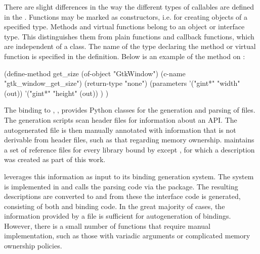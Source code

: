 \documentclass[article,shortnames]{jss}
\begin{document}
There are slight differences in the way the different types of
callables are defined in the . Functions may be marked
as constructors, i.e. for creating objects of a specified type.
Methods and virtual functions belong to an object or interface type.
This distinguishes them from plain functions and callback functions,
which are independent of a class. The name of the type declaring the
method or virtual function is specified in the definition.
Below is an
example of the  method on :
\begin{Code}
(define-method get_size
  (of-object "GtkWindow")
  (c-name "gtk_window_get_size")
  (return-type "none")
  (parameters
    '("gint*" "width" (out))
    '("gint*" "height" (out))
  )
)
\end{Code}


The  binding to ,
 \citep{PyGTK}, provides Python classes for the generation
and 
parsing of  files. The generation scripts scan
header 
files for information about an API. The autogenerated 
file
is then 
manually annotated with information that is not derivable from header
files, such as that
regarding memory ownership.  maintains a set of reference
 files
for every library bound by  except , for which a
description was created as part of this work.

 leverages this information as input to its binding
generation system.  The system is implemented in  and
calls the   parsing code via the
\citep{RSPython} package.  The resulting descriptions are converted to
 and from these the interface code is generated,
consisting of both  and  binding code. In the
great majority of cases, the information provided by a 
file is sufficient for autogeneration of bindings.  However, there is
a small number of functions that require manual implementation, such
as those with variadic arguments or complicated memory ownership
policies.
\end{document}
